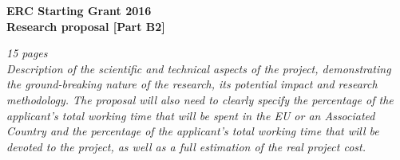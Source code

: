 \documentclass[11pt]{article}
\begin{document}
\lhead{\emph{\surname}}
\rhead{\project}
\cfoot{\thepage}

\newcommand{\note}[1]{{\color{red}\it #1}}

\begin{center}
  \vbox{\vspace{1.5cm}}
  \Large{\textbf{%
      ERC Starting Grant 2016\\
      Research proposal [Part B2]\\}
  }
  \vspace{1cm}
\end{center}

\note{15 pages\\
  Description of the scientific and technical aspects of the project,
  demonstrating the ground-breaking nature of the research, its potential
  impact and research methodology. The proposal will also need to clearly
  specify the percentage of the applicant's total working time that will be
  spent in the EU or an Associated Country and the percentage of the
  applicant’s total working time that will be devoted to the project, as well
  as a full estimation of the real project cost.
}

\tableofcontents




\appendix



%
\end{document}
